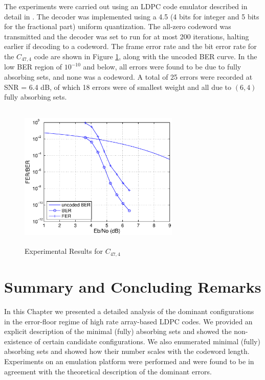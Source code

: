  The experiments were carried out using an LDPC code
emulator described in detail in \cite{zhang06}. The decoder was
implemented using a 4.5 (4 bits for integer and 5 bits for the
fractional part) uniform quantization. The all-zero codeword was
transmitted and the decoder was set to run for at most 200
iterations, halting earlier if decoding to a codeword. The frame
error rate and the bit error rate for the $C_{47,4}$ code are
shown in Figure \ref{expif}, along with the uncoded BER curve. In
the low BER region of $10^{-10}$ and below,
all errors were found to be due to %
fully absorbing sets, and none was a codeword. A total of 25
errors were recorded at SNR = 6.4 dB, of which 18 errors were of
smallest weight and all due to $(6,4)$ fully absorbing sets.

\vspace{0in}
\begin{figure}[h]
\center\includegraphics[keepaspectratio,width=3.0in,height=2.75in]{474_lara3.eps}
\caption{Experimental Results for $C_{47,4}$} \label{expif}
\end{figure}


\section{Summary and Concluding Remarks}

In this Chapter we presented a detailed analysis of the dominant
configurations in the error-floor regime of high rate array-based
LDPC codes. We provided an explicit description of the minimal
(fully) absorbing sets and showed the non-existence of certain
candidate configurations. We also enumerated minimal (fully)
absorbing sets and showed how their number scales with the
codeword length. Experiments on an emulation platform were
performed and were found to be in agreement with the theoretical
description of the dominant errors.
